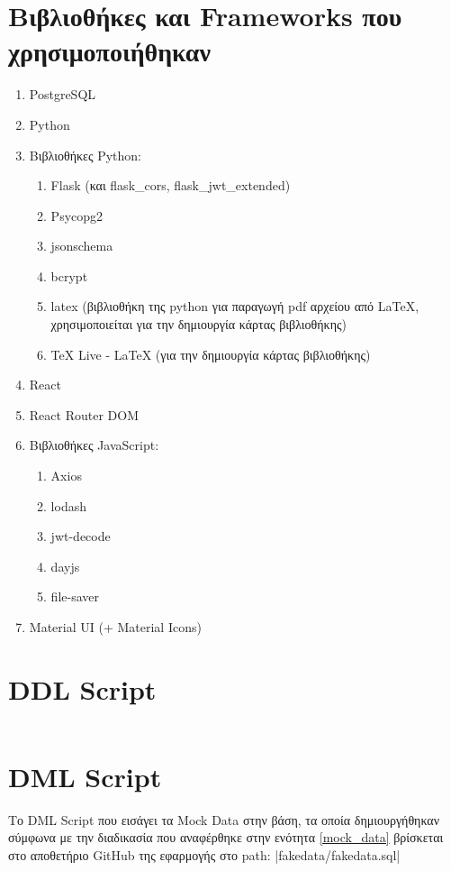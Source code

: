 \documentclass[a4paper]{article}
\begin{document}
\appendix

\section{Βιβλιοθήκες και Frameworks που χρησιμοποιήθηκαν}
\label{used_software}
\begin{enumerate}
    \item PostgreSQL
    \item Python
    \item Βιβλιοθήκες Python:
    \begin{enumerate}
        \item Flask (και flask\_cors, flask\_jwt\_extended)
        \item Psycopg2
        \item jsonschema
        \item bcrypt
        \item latex (βιβλιοθήκη της python για παραγωγή pdf αρχείου από LaTeX, χρησιμοποιείται για την δημιουργία κάρτας βιβλιοθήκης)
    \item TeX Live - LaTeX (για την δημιουργία κάρτας βιβλιοθήκης)
    \end{enumerate}   
    \item React
    \item React Router DOM
    \item Βιβλιοθήκες JavaScript:
    \begin{enumerate}
        \item Axios
        \item lodash
        \item jwt-decode
        \item dayjs
        \item file-saver
    \end{enumerate}
    \item Material UI (+ Material Icons)
\end{enumerate}

\section{DDL Script}
\label{appendix_ddl}
\inputminted[breaklines,linenos]{sql}{../../sql/schema.sql}

\section{DML Script}

\par Το DML Script που εισάγει τα Mock Data στην βάση, τα οποία δημιουργήθηκαν σύμφωνα με την διαδικασία που αναφέρθηκε στην ενότητα \ref{mock_data} βρίσκεται στο αποθετήριο GitHub της εφαρμογής στο path:
|fakedata/fakedata.sql|
\end{document}
